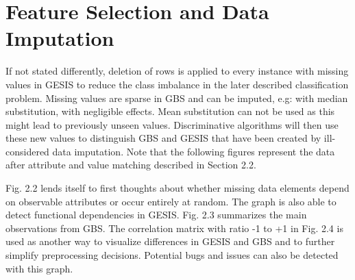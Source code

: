 \section{Feature Selection and Data Imputation}

If not stated differently, deletion of rows is applied to every instance with missing values in GESIS to reduce the class imbalance in the later described classification problem. Missing values are sparse in GBS and can be imputed, e.g: with median substitution, with negligible effects. Mean substitution can not be used as this might lead to previously unseen values. Discriminative algorithms will then use these new values to distinguish GBS and GESIS that have been created by ill-considered data imputation. Note that the following figures represent the data after attribute and value matching described in Section 2.2.

Fig. 2.2 lends itself to first thoughts about whether missing data elements depend on observable attributes or occur entirely at random. The graph is also able to detect functional dependencies in GESIS. Fig. 2.3 summarizes the main observations from GBS. The correlation matrix with ratio -1 to +1 in Fig. 2.4 is used as another way to visualize differences in GESIS and GBS and to further simplify preprocessing decisions. Potential bugs and issues can also be detected with this graph. 

